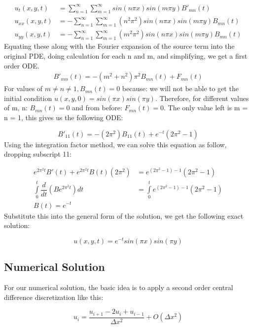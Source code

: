 \documentclass[12pt]{article}
\begin{document}
	\begin{align*}
		u_t(x,y,t) &= \sum_{n=1}^{\infty}\sum_{m=1}^{\infty} sin(n\pi x)sin(m\pi y)B'_{mn}(t)\\
		u_{xx}(x,y,t) &= -\sum_{n=1}^{\infty}\sum_{m=1}^{\infty} (n^2 \pi^2)sin(n\pi x)sin(m\pi y)B_{mn}(t)\\
		u_{yy}(x,y,t) &= -\sum_{n=1}^{\infty}\sum_{m=1}^{\infty} (m^2 \pi^2)sin(n\pi x)sin(m\pi y)B_{mn}(t)
	\end{align*}
	Equating these along with the Fourier expansion of the source term into the original PDE, doing calculation for each n and m, and simplifying, we get a first order ODE. 
	\begin{align*}
		B'_{mn}(t) = -(m^2+n^2)\pi ^2B_{mn}(t) + F_{mn}(t)
	\end{align*}
	For values of $m \neq n \neq 1, B_{mn}(t) = 0$ because: we will not be able to get the initial condition $u(x,y,0) = sin(\pi x)sin(\pi y)$.  Therefore, for different values of m, n: $B_{mn}(t) = 0$ and from before: $F_{mn}(t) = 0$. The only value left is m = n = 1, this gives us the following ODE:
	
	\begin{equation}
		B'_{11}(t) = -(2\pi^2)B_{11}(t) + e^{-t}(2\pi ^2 -1)
	\end{equation}
	Using the integration factor method, we can solve this equation as follow, dropping subscript 11:
	
	\begin{align*}
		e^{2\pi^2 t}B'(t) + e^{2\pi^2 t}B(t)(2\pi ^2) &= e^{(2\pi^2 -1)-1}(2\pi ^2 -1)\\
		\int\limits_{0}^{t} \dfrac{d}{dt}\left(Be^{2\pi^2 t}\right) dt &= \int\limits_{0}^{t}e^{(2\pi^2 -1)-1}(2\pi ^2 -1)\\
		\boxed{B(t)= e^{-t}}
	\end{align*}
	Substitute this into the general form of the solution, we get the following exact solution:
	
	\begin{equation}
		\boxed{u(x,y,t) = e^{-t}sin(\pi x)sin(\pi y)}
	\end{equation}
		
	\subsection{Numerical Solution}
	For our numerical solution, the basic idea is to apply a second order central difference discretization like this:
	
	\begin{equation}
		u_i = \dfrac{u_{i+1} - 2u_i + u_{i-1}}{\Delta x^2} + O(\Delta x^2)
	\end{equation}
	
\end{document}
